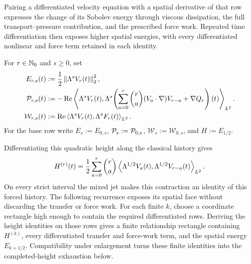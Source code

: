 Pairing a differentiated velocity equation with a spatial derivative of
that row expresses the change of its Sobolev energy through viscous
dissipation, the full transport--pressure contribution, and the prescribed
force work. Repeated time differentiation then exposes higher spatial energies,
with every differentiated nonlinear and force term retained in each identity.

\begin{definition}
\label{f:def:critical-height-rows}
For \(r\in\mathbb N_0\) and \(s\ge0\), set
\begin{align}
 E_{r,s}(t)&:=\frac12\left\lVert \Lambda^sV_r(t)\right\rVert_2^2,
 \label{f:eq:temporal-row-spatial-energy}\\
 \mathcal P_{r,s}(t)&:=-\operatorname{Re}
 \left\langle \Lambda^sV_r(t),\Lambda^s\!\left(
   \sum_{a=0}^{r}\binom ra(V_a\cdot\nabla)V_{r-a}+\nabla Q_r
 \right)(t)\right\rangle_{L^2}.
 \label{f:eq:temporal-row-pressure-complete-transfer}
 \\
 \mathcal W_{r,s}(t)&:=\operatorname{Re}
 \left\langle \Lambda^sV_r(t),\Lambda^sF_r(t)\right\rangle_{L^2}.
 \label{f:eq:temporal-row-force-work}
\end{align}
For the base row write \(E_s:=E_{0,s}\), \(\mathcal P_s:=\mathcal P_{0,s}\),
\(\mathcal W_s:=\mathcal W_{0,s}\), and \(H:=E_{1/2}\).
\end{definition}

Differentiating this quadratic height along the classical history gives
\[
 H^{(r)}(t)=\frac12\sum_{a=0}^r\binom ra
 \left\langle \Lambda^{1/2}V_a(t),\Lambda^{1/2}V_{r-a}(t)\right\rangle_{L^2}.
\]
On every strict interval the mixed jet makes this contraction an identity of
this forced history.  The following recurrence exposes its spatial face
without discarding the transfer or force work.  For each finite \(k\), choose
a coordinate rectangle high enough to contain the required differentiated
rows.  Deriving the height identities on those rows gives a finite relationship
rectangle containing \(H^{(k)}\), every differentiated transfer and force-work
term, and the spatial energy \(E_{k+1/2}\).  Compatibility under enlargement
turns these finite identities into the completed-height exhaustion below.

